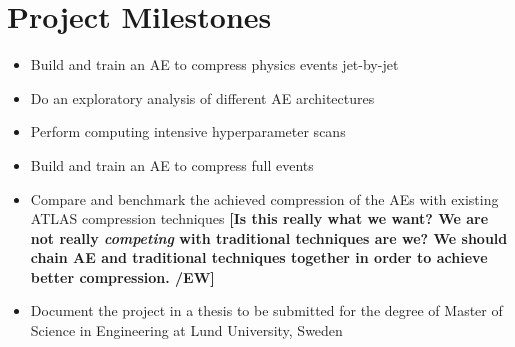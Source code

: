 \documentclass[11pt]{article}
\begin{document}
\section{Project Milestones}

\begin{itemize}
    \item Build and train an AE to compress physics events jet-by-jet
    \item Do an exploratory analysis of different AE architectures
    \item Perform computing intensive hyperparameter scans
    \item Build and train an AE to compress full events
    \item Compare and benchmark the achieved compression of the AEs with existing ATLAS compression techniques \textbf{[Is this really what we want? We are not really \textit{competing} with traditional techniques are we? We should chain AE and traditional techniques together in order to achieve better compression. /EW]}
    \item Document the project in a thesis to be submitted for the degree of Master of Science in Engineering at Lund University, Sweden
\end{itemize}{}




\end{document}
